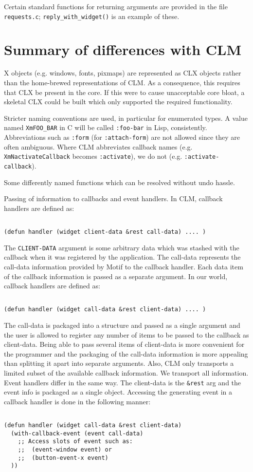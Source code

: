 \documentclass{article}
\begin{document}
Certain standard functions for returning arguments are provided in the file
\texttt{requests.c}; \texttt{reply\_with\_widget()} is an example of these.


\section{Summary of differences with CLM}

X objects (e.g. windows, fonts, pixmaps) are represented as CLX objects
rather than the home-brewed representations of CLM.  As a consequence,
this requires that CLX be present in the core.  If this were to cause
unacceptable core bloat, a skeletal CLX could be built which only
supported the required functionality.

Stricter naming conventions are used, in particular for enumerated
types.  A value named \texttt{XmFOO\_BAR} in C will be called
\texttt{:foo-bar} in Lisp, consistently.  Abbreviations such as
\texttt{:form} (for \texttt{:attach-form}) are not allowed since they
are often ambiguous.  Where CLM abbreviates callback names
(e.g. \texttt{XmNactivateCallback} becomes \texttt{:activate}), we do
not (e.g.  \texttt{:activate-callback}).

Some differently named functions which can be resolved without undo
hassle.

Passing of information to callbacks and event handlers.  In CLM,
callback handlers are defined as:

\begin{verbatim}

(defun handler (widget client-data &rest call-data) .... )

\end{verbatim}

The \texttt{CLIENT-DATA} argument is some arbitrary data which was
stashed with the callback when it was registered by the application.
The call-data represents the call-data information provided by Motif
to the callback handler.  Each data item of the callback information
is passed as a separate argument.  In our world, callback handlers are
defined as:

\begin{verbatim}

(defun handler (widget call-data &rest client-data) .... )

\end{verbatim}

The call-data is packaged into a structure and passed as a single
argument and the user is allowed to register any number of items to be
passed to the callback as client-data.  Being able to pass several
items of client-data is more convenient for the programmer and the
packaging of the call-data information is more appealing than
splitting it apart into separate arguments.  Also, CLM only transports
a limited subset of the available callback information.  We transport
all information.  Event handlers differ in the same way.  The
client-data is the \texttt{\&rest} arg and the event info is packaged
as a single object.  Accessing the generating event in a callback
handler is done in the following manner:

\begin{verbatim}

(defun handler (widget call-data &rest client-data)
  (with-callback-event (event call-data)
    ;; Access slots of event such as:
    ;;  (event-window event) or
    ;;  (button-event-x event)
  ))

\end{verbatim}
\end{document}

